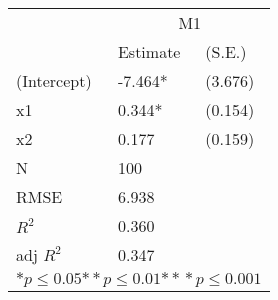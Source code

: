 \begin{tabular}{*{3}{l}}
\hline
                  & \multicolumn{2}{c}{M1}   \tabularnewline
                   &Estimate  &(S.E.)  \tabularnewline
 \hline
 \hline
   (Intercept)     &-7.464*   &   (3.676) \tabularnewline
   x1              &0.344*   &   (0.154) \tabularnewline
   x2              &0.177   &   (0.159) \tabularnewline
 \hline
 N                 &100       &        \tabularnewline
 RMSE             &6.938         & \tabularnewline
 $R^2$             &0.360         & \tabularnewline
 adj $R^2$         &0.347         & \tabularnewline
 \hline
\hline
 
 \multicolumn{3}{c}{${*  p}\le 0.05$${*\!\!*  p}\le 0.01$${*\!\!*\!\!*  p}\le 0.001$}\tabularnewline
 \end{tabular}